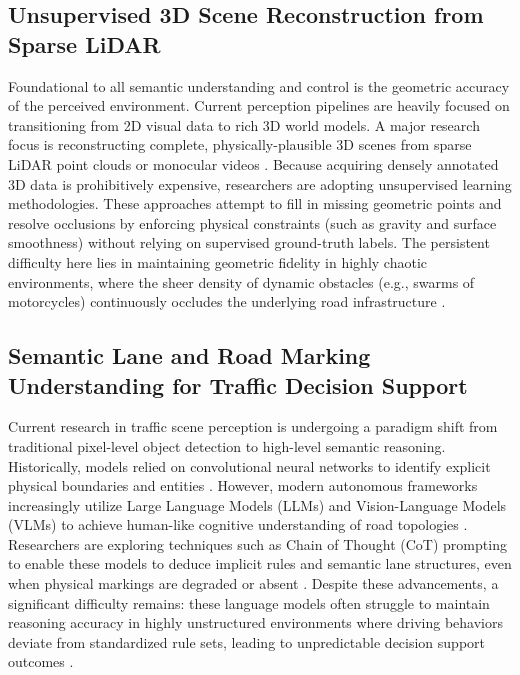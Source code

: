\documentclass[a4paper, 12pt]{article}
\begin{document}
	\subsection{Unsupervised 3D Scene Reconstruction from Sparse LiDAR}
	Foundational to all semantic understanding and control is the geometric accuracy of the perceived environment. Current perception pipelines are heavily focused on transitioning from 2D visual data to rich 3D world models. A major research focus is reconstructing complete, physically-plausible 3D scenes from sparse LiDAR point clouds or monocular videos \cite{cao2023graphmatching}. Because acquiring densely annotated 3D data is prohibitively expensive, researchers are adopting unsupervised learning methodologies. These approaches attempt to fill in missing geometric points and resolve occlusions by enforcing physical constraints (such as gravity and surface smoothness) without relying on supervised ground-truth labels. The persistent difficulty here lies in maintaining geometric fidelity in highly chaotic environments, where the sheer density of dynamic obstacles (e.g., swarms of motorcycles) continuously occludes the underlying road infrastructure \cite{vo2021density, wang2021interaction}.
	
	\subsection{Semantic Lane and Road Marking Understanding for Traffic Decision Support}
	Current research in traffic scene perception is undergoing a paradigm shift from traditional pixel-level object detection to high-level semantic reasoning. Historically, models relied on convolutional neural networks to identify explicit physical boundaries and entities \cite{nguyen2023object}. However, modern autonomous frameworks increasingly utilize Large Language Models (LLMs) and Vision-Language Models (VLMs) to achieve human-like cognitive understanding of road topologies \cite{zheng2024llmits, fu2024drivelm}. Researchers are exploring techniques such as Chain of Thought (CoT) prompting to enable these models to deduce implicit rules and semantic lane structures, even when physical markings are degraded or absent \cite{wei2022cot}. Despite these advancements, a significant difficulty remains: these language models often struggle to maintain reasoning accuracy in highly unstructured environments where driving behaviors deviate from standardized rule sets, leading to unpredictable decision support outcomes \cite{tian2025query, wen2023dilu}.
	
\end{document}
